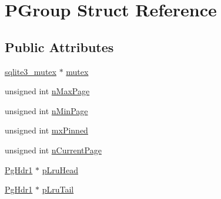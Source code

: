 \hypertarget{struct_p_group}{\section{P\-Group Struct Reference}
\label{struct_p_group}
}
\subsection*{Public Attributes}
\begin{DoxyCompactItemize}
\item 
\hyperlink{structsqlite3__mutex}{sqlite3\-\_\-mutex} $\ast$ \hyperlink{struct_p_group_a7173aa723aa61d6b1f79cde2f7d0f74d}{mutex}
\item 
unsigned int \hyperlink{struct_p_group_a219ff89d38529cbb6b47e60f41896f41}{n\-Max\-Page}
\item 
unsigned int \hyperlink{struct_p_group_aedf84324cb7138c9f9ee31814e8274c0}{n\-Min\-Page}
\item 
unsigned int \hyperlink{struct_p_group_ac7cdffac1c20d260e8230dba4ab05cea}{mx\-Pinned}
\item 
unsigned int \hyperlink{struct_p_group_a532a09e3e6bf7a20a934764b4bd698a5}{n\-Current\-Page}
\item 
\hyperlink{struct_pg_hdr1}{Pg\-Hdr1} $\ast$ \hyperlink{struct_p_group_a3d8ff5ee67a873462209676d0fc4c5a2}{p\-Lru\-Head}
\item 
\hyperlink{struct_pg_hdr1}{Pg\-Hdr1} $\ast$ \hyperlink{struct_p_group_a2c58c2f107352bccedc6e49b5f07a486}{p\-Lru\-Tail}
\end{DoxyCompactItemize}


